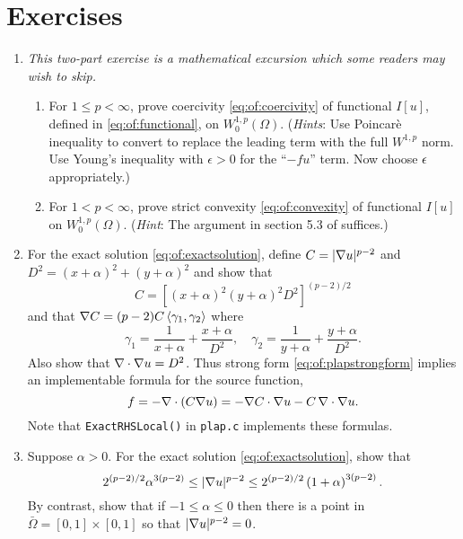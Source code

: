 \section{Exercises}

\renewcommand{\labelenumi}{\arabic{chapter}.\arabic{enumi}\quad}
\renewcommand{\labelenumii}{(\alph{enumii})}
\begin{enumerate}
\item  \label{exer:of:twoproperties}  \emph{This two-part exercise is a mathematical excursion which some readers may wish to skip.}
  \begin{enumerate}
  \item For $1 \le p < \infty$, prove coercivity \eqref{eq:of:coercivity} of functional $I[u]$, defined in \eqref{eq:of:functional}, on $W_0^{1,p}(\Omega)$.  (\emph{Hints}:  Use Poincar\`e inequality \citep[Theorem 6.30]{AdamsFournier2003} to convert to replace the leading term with the full $W^{1,p}$ norm.  Use Young's inequality with $\epsilon>0$ \citep[Appendix B]{Evans2010} for the ``$-fu$'' term.  Now choose $\epsilon$ appropriately.)
  \item For $1 < p < \infty$, prove strict convexity \eqref{eq:of:convexity} of functional $I[u]$ on $W_0^{1,p}(\Omega)$.  (\emph{Hint}:  The argument in section 5.3 of \citet{Ciarlet2002} suffices.)
  \end{enumerate}
 
\item \label{exer:of:checkexactformulas}  For the exact solution \eqref{eq:of:exactsolution}, define $C = |\nabla u|^{p-2}$ and $D^2=(x+\alpha)^2 + (y+\alpha)^2$ and show that
    $$C = \left[(x+\alpha)^2 (y+\alpha)^2 D^2\right]^{(p-2)/2}$$
and that $\nabla C = (p-2) C \left<\gamma_1,\gamma_2\right>$ where
    $$\gamma_1 = \frac{1}{x+\alpha}+ \frac{x+\alpha}{D^2}, \quad \gamma_2 = \frac{1}{y+\alpha}+ \frac{y+\alpha}{D^2}.$$
Also show that $\nabla\cdot \nabla u = D^2$.  Thus strong form \eqref{eq:of:plapstrongform} implies an implementable formula for the source function,
    $$f = - \nabla\cdot \left(C \nabla u\right) = - \nabla C \cdot \nabla u - C\, \nabla\cdot \nabla u.$$
Note that \texttt{ExactRHSLocal()} in \texttt{plap.c} implements these formulas.

\item \label{exer:of:checkexactbounds} Suppose $\alpha > 0$.  For the exact solution \eqref{eq:of:exactsolution}, show that
\begin{equation}
2^{(p-2)/2} \alpha^{3(p-2)} \le |\nabla u|^{p-2} \le 2^{(p-2)/2} \left(1+\alpha\right)^{3(p-2)}.  \label{eq:of:coeffbounds}
\end{equation}
By contrast, show that if $-1 \le \alpha \le 0$ then there is a point in $\bar\Omega=[0,1]\times[0,1]$ so that $|\nabla u|^{p-2}=0$.


\end{enumerate}
